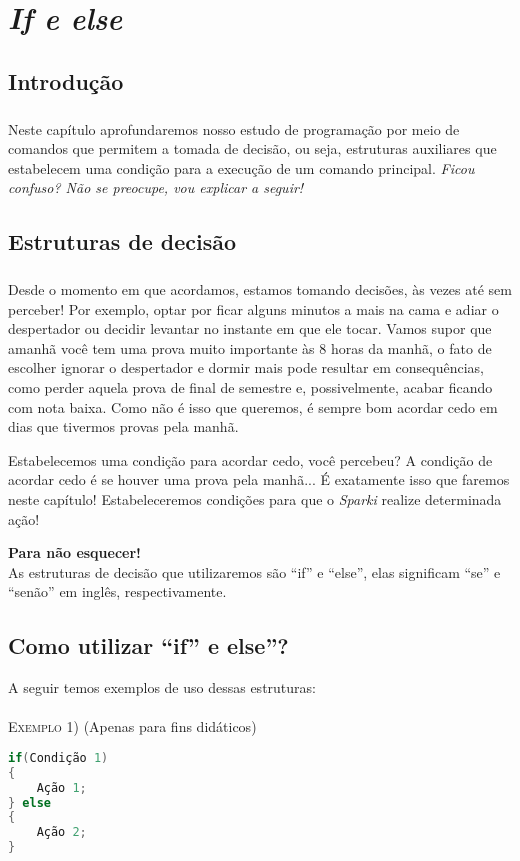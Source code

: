 \chapter{\textit{If e else}}
\section*{Introdução}
    \paragraph{}
    Neste capítulo aprofundaremos nosso estudo de programação por meio de comandos que permitem a tomada de decisão, ou seja,  estruturas auxiliares que estabelecem uma condição para a execução de um comando principal. \textsl{Ficou confuso? Não se preocupe, vou explicar a seguir!}

\section{Estruturas de decisão}
    \paragraph{}
    Desde o momento em que acordamos, estamos tomando decisões, às vezes até sem perceber! Por exemplo, optar por ficar alguns minutos a mais na cama e adiar o despertador ou decidir levantar no instante em que ele tocar. Vamos supor que amanhã você tem uma prova muito importante às 8 horas da manhã, o fato de escolher ignorar o despertador e dormir mais pode resultar em consequências, como perder aquela prova de final de semestre e, possivelmente, acabar ficando com nota baixa. Como não é isso que queremos, é sempre bom acordar cedo em dias que tivermos provas pela manhã.
    
    Estabelecemos uma condição para acordar cedo, você percebeu? A condição de acordar cedo é se houver uma prova pela manhã... É exatamente isso que faremos neste capítulo! Estabeleceremos condições para que o \textsl{Sparki} realize determinada ação!

\begin{center}
    
   \textcolor{mydarkblue}{\textbf{Para não esquecer!}}
   \\As estruturas de decisão que utilizaremos são ``if'' e ``else'', elas significam ``se'' e ``senão'' em inglês, respectivamente.
    \end{center}
    
    
\section{Como utilizar ``if'' e else''?}
    A seguir temos exemplos de uso dessas estruturas:
    \\~\\
    \textsc{Exemplo 1)} (Apenas para fins didáticos)
\begin{lstlisting}[language=C]
if(Condição 1) 
{
    Ação 1;
} else 
{
    Ação 2;
}
\end{lstlisting}
    
